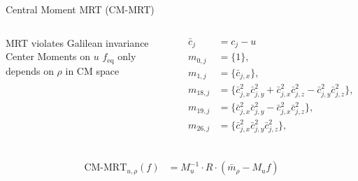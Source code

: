 \placelogofalse
\begin{frame}{Central Moment MRT (CM-MRT)}
\begin{columns}
\begin{outline}
\1 MRT violates Galilean invariance 
\1 Center Moments on $u$ \cite{De2017}
\1 $f_{\text{eq}}$ only depends on $\rho$ in CM space
\end{outline}
\begin{center}
\begin{align*}
\bar{c}_j &= c_j - u \\
m_{0,j} &= \{  1 \},\\
m_{1,j} &= \{  \bar{c}_{j,x} \}, \\
m_{18,j} &= \{ \bar{c}_{j,x}^2 \bar{c}_{j,y}^2 + \bar{c}_{j,x}^2 \bar{c}_{j,z}^2 - \bar{c}_{j,y}^2 \bar{c}_{j,z}^2 \}, \\
m_{19,j} &= \{ \bar{c}_{j,x}^2 \bar{c}_{j,y}^2 - \bar{c}_{j,x}^2 \bar{c}_{j,z}^2 \},\\
m_{26,j} &= \{ \bar{c}_{j,x}^2 \bar{c}_{j,y}^2 \bar{c}_{j,z}^2 \},\\
\end{align*}
\end{center}
\end{columns}
\begin{center}
  \begin{align*}
\text{CM-MRT}_{u,\rho}(f) &= M_u^{-1} \cdot R \cdot (\bar{m}_{\rho} - M_u f)
\end{align*}
\end{center}
\end{frame}
\placelogotrue
